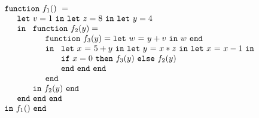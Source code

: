 \begin{equation}
\label{FunctionalConstructionProgramLCDropped}
\begin{array}{l}
\mathtt{function}\ f_1()\ = \\
  \quad
  \begin{array}{l}
     \mathtt{let}\ v = 1 \ 
     \mathtt{in\ let}\ z = 8 \ 
     \mathtt{in\ let}\ y = 4\\
     \mathtt{in}\ 
     \begin{array}[t]{l}
       \mathtt{function}\ f_2(y) = \\
       \quad \begin{array}{l}  
               \mathtt{function}\ f_3(y) = \letin w {y+v} w\\
               \mathtt{in}\
               \begin{array}[t]{l}
                  \letinD x {5+y} {
                  \letinD y {x*z} {
                   \letinD x {x-1} {}}}\\ 
                  \ite {x=0} {\call {f_3} {y}}
                     {\call {f_2} {y}}\\
                  \mathtt{end}\ \mathtt{end}\ \mathtt{end}
               \end{array}\\
               \mathtt{end}
             \end{array}\\
       \mathtt{in}\ f_2(y)\ \mathtt{end}
     \end{array}\\
     \mathtt{end}\ \mathtt{end}\ \mathtt{end}
  \end{array}\\
  \mathtt{in}\ f_1()\ \mathtt{end}
\end{array}
\end{equation}
